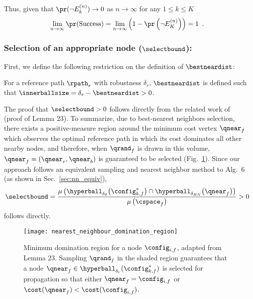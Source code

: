 Thus, given that $\pr(\neg E^{(n)}_k) \rightarrow 0$ as $n \rightarrow \infty$ for any $1 \leq k \leq K$
\begin{equation}
    \lim_{n \rightarrow \infty} \pr(\textrm{Success}) = \lim_{n \rightarrow \infty} \left( 1 - \pr\left( \neg E^{(n)}_K \right) \right) = 1 \enspace.
\end{equation}



\subsubsection{Selection of an appropriate node ($\selectbound$):}
\label{sec:select}

First, we define the following restriction on the definition of $\bestneardist$: 

\begin{definition}
\label{prop:bestnear_requirement}
    For a reference path $\rpath_r$ with robustness $\delta_r$, $\bestneardist$ is defined such that $\innerballsize = \delta_r - \bestneardist > 0$.
\end{definition}

The proof that $\selectbound > 0$ follows directly from the related work of \cite{LiAOKP2016} (proof of Lemma 23).  To summarize, due to best-nearest neighbors selection, there exists a positive-measure region around the minimum cost vertex $\qnear_f$ which observes the optimal reference path in which its cost dominates all other nearby nodes, and therefore, when $\qrand_f$ is drawn in this volume, $\qnear_f = (\qnear_r, \qnear_b)$ is guaranteed to be selected (Fig.~\ref{fig:Yanbo_lemma_23_figure}).  Since our approach follows an equivalent sampling and nearest neighbor method to \cite{LiAOKP2016} Alg.~6 (as shown in Sec.~\ref{sec:nn_equiv}), 
\begin{equation}
    \selectbound = \frac{\mu\left( \hyperball_{\delta_\theta}\big( \config_{k,f}^* \big) \cap \hyperball_{\delta_{BN}}\big( \qnear_f \big) \right)}{\mu\left( \cspace_f \right)} > 0
\end{equation}
follows directly.

\begin{figure}[t]
    \centering
    \texttt{[image: nearest\_neighbour\_domination\_region]}
    \caption{Minimum domination region for a node $\config_{i,f}$, adapted from \cite{LiAOKP2016} Lemma 23. Sampling $\qrand_f$ in the shaded region guarantees that a node $\qnear_f \in \hyperball_{\delta_r}(\config_{k,f}^*)$ is selected for propagation so that either $\qnear_f = \config_{i,f}$ or $\cost(\qnear_f) < \cost(\config_{i,f})$.}
    \label{fig:Yanbo_lemma_23_figure}
\end{figure}


